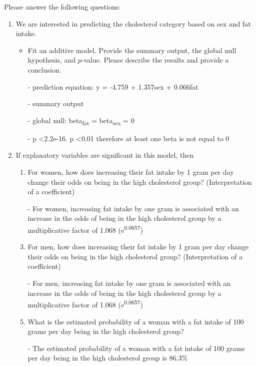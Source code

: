 \documentclass[12pt,letterpaper]{article}
\begin{document}
\newpage
\noindent Please answer the following questions:

\begin{enumerate}
	\item
	We are interested in predicting the cholesterol category based on sex and fat intake.
	\begin{itemize}
		\item
		Fit an additive model. Provide the summary output, the global null hypothesis, and $p$-value. Please describe the results and provide a conclusion.
		\item [-] prediction equation: y = -4.759 + 1.357sex + 0.066fat
		
		\item[-] summary output
		
		\item[-] global null: beta\textsubscript{fat} = beta\textsubscript{sex} = 0
		\item[-] p \textless 2.2e-16. p \textless 0.01 therefore at least one beta is not equal to 0 
		
		
	\end{itemize}
	
	\item
	If explanatory variables are significant in this model, then
	\begin{enumerate}
		\item
		For women, how does increasing their fat intake by 1 gram per day change their odds on being in the high cholesterol group? (Interpretation of a coefficient)
		\item[-] For women, increasing fat intake by one gram is associated with an increase in the odds of being in the high cholesterol group by a multiplicative factor of 1.068 (e\textsuperscript{0.0657})
		\item
		For men, how does increasing their fat intake by 1 gram per day change their odds on being in the high cholesterol group? (Interpretation of a coefficient)
		\item[-] For men, increasing fat intake by one gram is associated with an increase in the odds of being in the high cholesterol group by a multiplicative factor of 1.068 (e\textsuperscript{0.0657})
		\item
		What is the estimated probability of a woman with a fat intake of 100 grams per day being in the high cholesterol group? 
		\item[-] The estimated probability of a woman with a fat intake of 100 grams per day being in the high cholesterol group is 86.3\%
		
		

\end{enumerate}
\end{enumerate}
\end{document}
